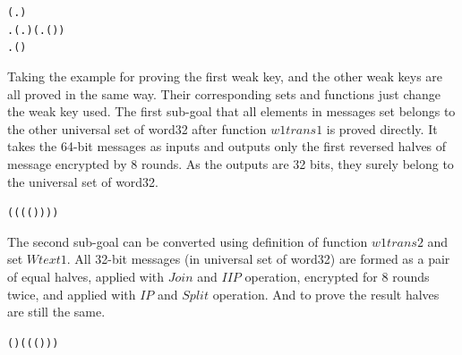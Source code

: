 \documentclass{article}
\begin{document}
\begin{alltt}
   \HOLTokenTurnstile{}     \HOLSymConst{\HOLTokenEquiv{}}
   (\HOLSymConst{\HOLTokenForall{}}.  \HOLSymConst{\HOLTokenIn{}}  \HOLSymConst{\HOLTokenImp{}}   \HOLSymConst{\HOLTokenIn{}} ) \HOLSymConst{\HOLTokenConj{}}
   \HOLSymConst{\HOLTokenExists{}}. (\HOLSymConst{\HOLTokenForall{}}.  \HOLSymConst{\HOLTokenIn{}}  \HOLSymConst{\HOLTokenImp{}}   \HOLSymConst{\HOLTokenIn{}} ) \HOLSymConst{\HOLTokenConj{}} (\HOLSymConst{\HOLTokenForall{}}.  \HOLSymConst{\HOLTokenIn{}}  \HOLSymConst{\HOLTokenImp{}}  ( ) \HOLSymConst{=} ) \HOLSymConst{\HOLTokenConj{}}
       \HOLSymConst{\HOLTokenForall{}}.  \HOLSymConst{\HOLTokenIn{}}  \HOLSymConst{\HOLTokenImp{}}  ( ) \HOLSymConst{=} 
\end{alltt}

Taking the example for proving the first weak key, and the other weak keys are all proved in the same way. Their corresponding
sets and functions just change the weak key used.
The first sub-goal that all elements in messages set belongs to the other universal set of word32 after function $w1trans1$ is
proved directly. It takes the 64-bit messages as inputs and outputs only the first reversed halves of message encrypted by 8
rounds. As the outputs are 32 bits, they surely belong to the universal set of word32.

\begin{alltt}
   \HOLTokenTurnstile{}   \HOLSymConst{=}  ( ( (  (  ) )))
\end{alltt}

The second sub-goal can be converted using definition of function $w1trans2$ and set $Wtext1$. All 32-bit messages
(in universal set of word32) are formed as a pair of equal halves, applied with $Join$ and $IIP$ operation, encrypted
for 8 rounds twice, and applied with $IP$ and $Split$ operation. And to prove the result halves are still the same.

\begin{alltt}
   \HOLTokenTurnstile{}   \HOLSymConst{=}   (  ) ( ( (\HOLSymConst{,})))
\end{alltt}
\end{document}

